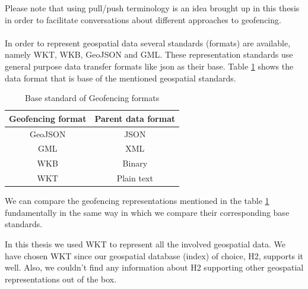 \documentclass[a4]{report}
\begin{document}
    Please note that using pull/push terminology is an idea brought up in this thesis in order to facilitate
    conversations about different approaches to geofencing.

    \paragraph{}
    In order to represent geospatial data several standards (formats) are available, namely WKT\cite{WKT}, WKB\cite{wkb},
    GeoJSON\cite{geoJson} and GML\cite{gml}.
    These representation standards use general purpose data transfer formats like json as their base.
    Table \ref{table:geofencing-formats} shows the data format that is base of the mentioned geospatial standards.

    \begin{table}[h!]
        \centering
        \begin{tabular}{|c|c|}
            \hline
            Geofencing format & Parent data format \\
            \hline
            GeoJSON           & JSON               \\
            GML               & XML                \\
            WKB               & Binary             \\
            WKT               & Plain text         \\
            \hline
        \end{tabular}
        \caption{Base standard of Geofencing formats}
        \label{table:geofencing-formats}
    \end{table}

    We can compare the geofencing representations mentioned in the table \ref{table:geofencing-formats} fundamentally
    in the same way in which we compare their corresponding base standards.

    In this thesis we used WKT to represent all the involved geospatial data.
    We have chosen WKT since our geospatial database (index) of choice, H2\cite{h2}, supports it well.
    Also, we couldn't find any information about H2 supporting other geospatial representations out of the box.
\end{document}
